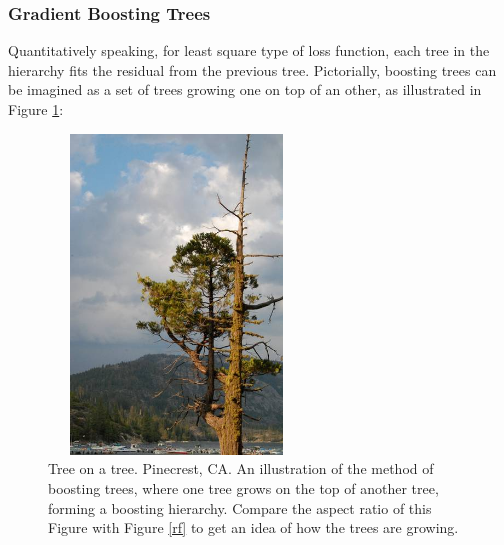 \documentclass[
11pt, %
a4paper, %
oneside, %
headinclude,footinclude, %
BCOR5mm, %
]{scrartcl}
\begin{document}
\subsubsection{Gradient Boosting Trees}\label{boostingtrees}
Quantitatively speaking, for least square type of loss function, each tree in the hierarchy fits the residual from the previous tree. Pictorially, boosting trees can be imagined as a set of trees growing one on top of an other, as illustrated in Figure \ref{boosting}:

\begin{figure}[ht!]
\centering
\includegraphics[width=6.8cm, height=8.5cm]{boosting.jpg} 
\caption{Tree on a tree. Pinecrest, CA. An illustration of the method of boosting trees, where one tree grows on the top of another tree, forming a boosting hierarchy. Compare the aspect ratio of this Figure with Figure \ref{rf} to get an idea of how the trees are growing.}\label{boosting}
\end{figure}
\end{document}
